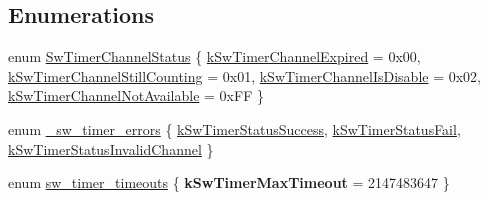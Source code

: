 \subsection*{Enumerations}
\begin{DoxyCompactItemize}
\item 
enum \hyperlink{group__sw__timer_ga44b572e8abe4da32037ad911b133f0be}{Sw\+Timer\+Channel\+Status} \{ \hyperlink{group__sw__timer_gga44b572e8abe4da32037ad911b133f0beaccc7b14e60e47ddac04fd489a4d17cf0}{k\+Sw\+Timer\+Channel\+Expired} = 0x00, 
\hyperlink{group__sw__timer_gga44b572e8abe4da32037ad911b133f0bea52d9aacf178b2dcb1bb96a73b5dac3ef}{k\+Sw\+Timer\+Channel\+Still\+Counting} = 0x01, 
\hyperlink{group__sw__timer_gga44b572e8abe4da32037ad911b133f0bea4bb8ee91a14fd415eb2a8eae57c610b5}{k\+Sw\+Timer\+Channel\+Is\+Disable} = 0x02, 
\hyperlink{group__sw__timer_gga44b572e8abe4da32037ad911b133f0bea38fb994fa8e94a6d4481aee3aee7943e}{k\+Sw\+Timer\+Channel\+Not\+Available} = 0x\+FF
 \}
\item 
enum \hyperlink{group__sw__timer_gab8c4026a7bceba5518af412d2d289c9c}{\+\_\+sw\+\_\+timer\+\_\+errors} \{ \hyperlink{group__sw__timer_ggab8c4026a7bceba5518af412d2d289c9caab7c18ff1b7358fc892f275d3a0702c1}{k\+Sw\+Timer\+Status\+Success}, 
\hyperlink{group__sw__timer_ggab8c4026a7bceba5518af412d2d289c9ca89b47823684a90940d1eccf3ee9407f9}{k\+Sw\+Timer\+Status\+Fail}, 
\hyperlink{group__sw__timer_ggab8c4026a7bceba5518af412d2d289c9cae3ac3f7f169fff145d07a271193af420}{k\+Sw\+Timer\+Status\+Invalid\+Channel}
 \}
\item 
enum \hyperlink{group__sw__timer_ga8eb74c42765e0114fb15920babe0db28}{sw\+\_\+timer\+\_\+timeouts} \{ {\bfseries k\+Sw\+Timer\+Max\+Timeout} = 2147483647
 \}
\end{DoxyCompactItemize}
